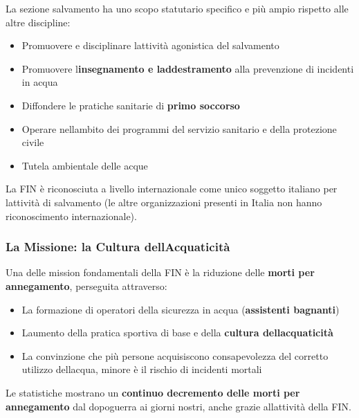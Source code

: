 \documentclass[a4paper,11pt]{article}
\providecommand{\tightlist}{%
  \setlength{\itemsep}{0pt}\setlength{\parskip}{0pt}}
\begin{document}
La sezione salvamento ha uno scopo statutario specifico e più ampio
rispetto alle altre discipline:

\begin{itemize}
      \tightlist
      \item
            Promuovere e disciplinare l\textquotesingle attività agonistica del
            salvamento
      \item
            Promuovere l\textquotesingle{}\textbf{insegnamento e
                  l\textquotesingle addestramento} alla prevenzione di incidenti in
            acqua
      \item
            Diffondere le pratiche sanitarie di \textbf{primo soccorso}
      \item
            Operare nell\textquotesingle ambito dei programmi del servizio
            sanitario e della protezione civile
      \item
            Tutela ambientale delle acque
\end{itemize}

La FIN è riconosciuta a livello internazionale come unico soggetto
italiano per l\textquotesingle attività di salvamento (le altre
organizzazioni presenti in Italia non hanno riconoscimento
internazionale).

\subsubsection{La Missione: la Cultura
      dell\textquotesingle Acquaticità}\label{la-missione-la-cultura-dellacquaticituxe0}

Una delle mission fondamentali della FIN è la riduzione delle
\textbf{morti per annegamento}, perseguita attraverso:

\begin{itemize}
      \tightlist
      \item
            La formazione di operatori della sicurezza in acqua
            (\textbf{assistenti bagnanti})
      \item
            L\textquotesingle aumento della pratica sportiva di base e della
            \textbf{cultura dell\textquotesingle acquaticità}
      \item
            La convinzione che più persone acquisiscono consapevolezza del
            corretto utilizzo dell\textquotesingle acqua, minore è il rischio di
            incidenti mortali
\end{itemize}

Le statistiche mostrano un \textbf{continuo decremento delle morti per
      annegamento} dal dopoguerra ai giorni nostri, anche grazie
all\textquotesingle attività della FIN.
\end{document}
